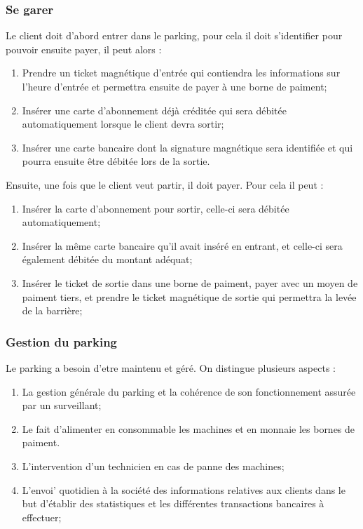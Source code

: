\documentclass[a4paper]{article}
\begin{document}
\subsubsection{Se garer}
Le client doit d'abord entrer dans le parking, pour cela il doit s'identifier pour pouvoir ensuite payer, il peut alors :
\begin{enumerate}
		\item Prendre un ticket magn\'etique d'entr\'ee qui contiendra les informations sur l'heure d'entr\'ee et permettra ensuite de payer \`a une borne de paiment;
		\item Ins\'erer une carte d'abonnement d\'ej\`a cr\'edit\'ee qui sera d\'ebit\'ee automatiquement lorsque le client devra sortir;
		\item Ins\'erer une carte bancaire dont la signature magn\'etique sera identifi\'ee et qui pourra ensuite \^etre d\'ebit\'ee lors de la sortie.
\end{enumerate}

Ensuite, une fois que le client veut partir, il doit payer. Pour cela il peut :
\begin{enumerate}
		\item Ins\'erer la carte d'abonnement pour sortir, celle-ci sera d\'ebit\'ee automatiquement;
		\item Ins\'erer la m\^eme carte bancaire qu'il avait ins\'er\'e en entrant, et celle-ci sera \'egalement d\'ebit\'ee du montant ad\'equat;
		\item Ins\'erer le ticket de sortie dans une borne de paiment, payer avec un moyen de paiment tiers, et prendre le ticket magn\'etique de sortie qui permettra la lev\'ee de la barri\`ere;
\end{enumerate}

\subsubsection{Gestion du parking}
Le parking a besoin d'etre maintenu et g\'er\'e. On distingue plusieurs aspects :
\begin{enumerate}
		\item La gestion g\'en\'erale du parking et la coh\'erence de son fonctionnement assur\'ee par un surveillant;
		\item Le fait d'alimenter en consommable les machines et en monnaie les bornes de paiment.
		\item L'intervention d'un technicien en cas de panne des machines;
		\item L'envoi' quotidien \`a la soci\'et\'e des informations relatives aux clients dans le but d'\'etablir des statistiques et les diff\'erentes transactions bancaires \`a effectuer;
\end{enumerate}
\end{document}
